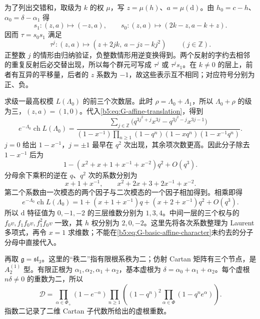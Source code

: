 为了列出交错和，取级为 \(k\) 的权 \(\mu\)，写 \(z=\mu(h)\)、\(a=\mu(\mathrm d)\)。由 \(h_0=c-h\)、\(\alpha_0=\delta-\alpha_1\) 得
\[
	s_1:(z,a)\longmapsto(-z,a),\qquad
	s_0:(z,a)\longmapsto(2k-z,a-k+z).
\]
因而 \(\tau=s_0s_1\) 满足
\begin{equation}\label{b5:eq:G-affine-translation}
	\tau^j:(z,a)\longmapsto(z+2jk,\ a-jz-kj^2)\qquad(j\in\mathbb Z).
\end{equation}
正整数 \(j\) 的情形由归纳验证，负整数情形用逆变换得到。两个反射的字约去相邻的重复反射后必交替出现，所以每个群元可写成 \(\tau^j\) 或 \(\tau^js_1\)。在 \(k\ne0\) 的层上，前者有互异的平移量，后者的 \(z\) 系数为 \(-1\)，故这些表示互不相同；对应符号分别为正、负。

\begin{example}\label{b5:exmp:G-basic-character}
	求级一最高权模 \(L(\Lambda_0)\) 的前三个次数层。此时 \(\rho=\Lambda_0+\Lambda_1\)，所以 \(\Lambda_0+\rho\) 的级为三，\((z,a)=(1,0)\)。代入\eqref{b5:eq:G-affine-translation}，得到
	\begin{equation}\label{b5:eq:G-basic-affine-character}
		e^{-\Lambda_0}\operatorname{ch}L(\Lambda_0)
		=\frac{\displaystyle\sum_{j\in\mathbb Z}
		\bigl(q^{3j^2+j}x^{3j}-q^{3j^2-j}x^{3j-1}\bigr)}
		{\displaystyle(1-x^{-1})\prod_{n\ge1}(1-q^n)(1-xq^n)(1-x^{-1}q^n)}.
	\end{equation}
	\(j=0\) 给出 \(1-x^{-1}\)，\(j=\pm1\) 最早在 \(q^2\) 次出现，其余项次数更高。因此分子除去 \(1-x^{-1}\) 后为
	\[
		1-(x^2+x+1+x^{-1}+x^{-2})q^2+O(q^3).
	\]
	分母余下乘积的逆在 \(q\)、\(q^2\) 次的系数分别为
	\[
		x+1+x^{-1},\qquad x^2+2x+3+2x^{-1}+x^{-2}.
	\]
	第二个系数由一次模态的两个因子与二次模态的一个因子相加得到。相乘即得
	\begin{equation}\label{b5:eq:G-basic-first-grades}
		e^{-\Lambda_0}\operatorname{ch}L(\Lambda_0)
		=1+(x+1+x^{-1})q+(x+2+x^{-1})q^2+O(q^3).
	\end{equation}
	所以 \(\mathrm d\) 特征值为 \(0,-1,-2\) 的三层维数分别为 \(1,3,4\)。中间一层的三个权与的 \(f_0v,f_1f_0v,f_1^2f_0v\) 一致，其 \(h\) 权分别为 \(2,0,-2\)。这里先将各次系数整理为 Laurent 多项式，再令 \(x=1\) 求维数；不能在\eqref{b5:eq:G-basic-affine-character}未约去的分子分母中直接代入。
\end{example}

再取 \(\mathfrak g=\mathfrak{sl}_3\)。这里的“秩二”指有限根系秩为二；仿射 Cartan 矩阵有三个节点，是 \(A_2^{(1)}\) 型。有限正根为 \(\alpha_1,\alpha_2,\alpha_1+\alpha_2\)，基本虚根为 \(\delta=\alpha_0+\alpha_1+\alpha_2\)。每个虚根 \(n\delta\ne0\) 的重数为二，所以
\begin{equation}\label{b5:eq:G-sl3-denominator}
	\mathcal D=\prod_{\alpha\in\Phi_+}(1-e^{-\alpha})
	\prod_{n\ge1}\left((1-q^n)^2\prod_{\alpha\in\Phi}(1-q^n e^\alpha)\right).
\end{equation}
指数二记录了二维 Cartan 子代数所给出的虚根重数。


